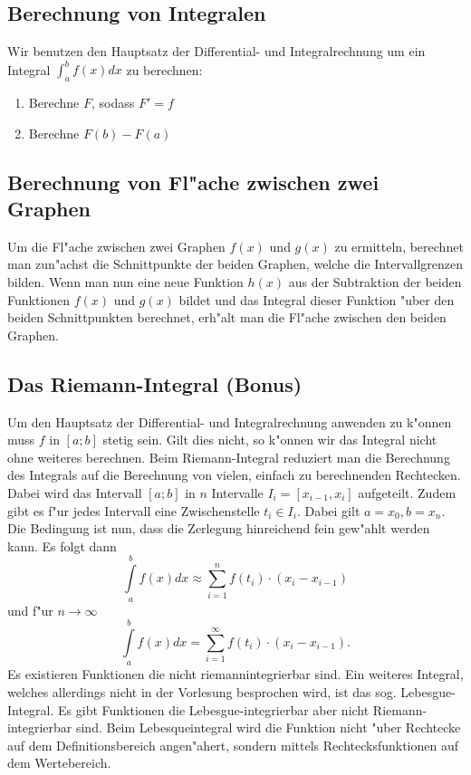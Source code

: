 
\subsection{Berechnung von Integralen}
Wir benutzen den Hauptsatz der Differential- und Integralrechnung um ein Integral $\int_a^b f(x) dx$ zu berechnen:
\begin{enumerate}
\item Berechne $F$, sodass $F' = f$
\item Berechne $F(b)-F(a)$
\end{enumerate}

\subsection{Berechnung von Fl"ache zwischen zwei Graphen}
Um die Fl"ache zwischen zwei Graphen $f(x)$ und $g(x)$ zu ermitteln, berechnet man zun"achst die Schnittpunkte der beiden Graphen, welche die Intervallgrenzen bilden. Wenn man nun eine neue Funktion $h(x)$ aus der Subtraktion der beiden Funktionen $f(x)$ und $g(x)$ bildet und das Integral dieser Funktion "uber den beiden Schnittpunkten berechnet, erh"alt man die Fl"ache zwischen den beiden Graphen.

\subsection{Das Riemann-Integral (Bonus)}
Um den Hauptsatz der Differential- und Integralrechnung anwenden zu k"onnen muss $f$ in $\left[a;b\right]$ stetig sein. Gilt dies nicht, so k"onnen wir das Integral nicht ohne weiteres berechnen. Beim Riemann-Integral reduziert man die Berechnung des Integrals auf die Berechnung von vielen, einfach zu berechnenden Rechtecken. Dabei wird das Intervall $\left[a;b \right]$ in $n$ Intervalle $I_i = \left[x_{i-1}, x_i \right]$ aufgeteilt. Zudem gibt es f"ur jedes Intervall eine Zwischenstelle $t_i \in I_i$. Dabei gilt $a = x_0, b = x_n$. Die Bedingung ist nun, dass die Zerlegung hinreichend fein gew"ahlt werden kann. Es folgt dann
\begin{equation*}
\int\limits_a^b f(x) dx \approx \sum\limits_{i=1}^n f(t_i) \cdot (x_{i} - x_{i-1})
\end{equation*}
und f"ur $n \to \infty$
\begin{equation*}
\int\limits_a^b f(x) dx = \sum\limits_{i=1}^\infty f(t_i) \cdot (x_{i} - x_{i-1}).
\end{equation*}
Es existieren Funktionen die nicht riemannintegrierbar sind. Ein weiteres Integral, welches allerdings nicht in der Vorlesung besprochen wird, ist das sog. Lebesgue-Integral. Es gibt Funktionen die Lebesgue-integrierbar aber nicht Riemann-integrierbar sind. Beim Lebesqueintegral wird die Funktion nicht "uber Rechtecke auf dem Definitionsbereich angen"ahert, sondern mittels Rechtecksfunktionen auf dem Wertebereich.

